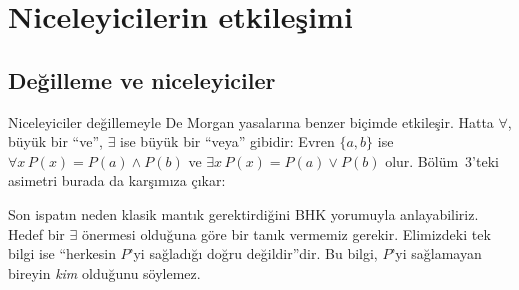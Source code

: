 \section{Niceleyicilerin etkileşimi}\label{sec:niceleyici-etkilesim}

\subsection{Değilleme ve niceleyiciler}

Niceleyiciler değillemeyle De Morgan yasalarına benzer biçimde etkileşir.
Hatta $\forall$, büyük bir ``ve'', $\exists$ ise büyük bir ``veya''
gibidir: Evren $\{a, b\}$ ise $\forall x\,P(x) = P(a) \wedge P(b)$ ve
$\exists x\,P(x) = P(a) \vee P(b)$ olur. Bölüm~3'teki asimetri burada
da karşımıza çıkar:


\noindent Son ispatın neden klasik mantık gerektirdiğini BHK yorumuyla
anlayabiliriz. Hedef bir $\exists$ önermesi olduğuna göre bir tanık
vermemiz gerekir. Elimizdeki tek bilgi ise ``herkesin $P$'yi sağladığı
doğru değildir''dir. Bu bilgi, $P$'yi sağlamayan bireyin \emph{kim}
olduğunu söylemez.

